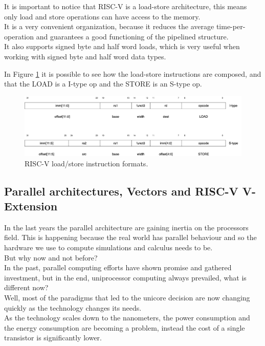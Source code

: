 It is important to notice that RISC-V is a load-store architecture, this means only load and store operations can have access to the memory.\\
It is a very convenient organization, because it reduces the average time-per-operation and guarantees a good functioning of the pipelined structure.\\

It also supports signed byte and half word loads, which is very useful when  working with signed byte and half word data types.

In Figure \ref{riscv-load-store} it is possible to see how the load-store instructions are composed, and that the LOAD is a I-type op and the STORE is an S-type op.

\begin{figure}[H]
    \centering
    \includegraphics[scale = 0.27]{Chapter_1/img/riscv-load-store.png}
    \caption{RISC-V load/store instruction formats. \cite{RISC-V-Instruction-Set-Manual}}
    \label{riscv-load-store}
\end{figure}


\subsection{Parallel architectures, Vectors and RISC-V V-Extension}
In the last years the parallel architecture are gaining inertia on the processors field. This is happening because the real world has parallel behaviour and so the hardware we use to compute simulations and calculus needs to be.\cite{Parallel-Computing}\\
But why now and not before?\\
In the past, parallel computing efforts have shown promise and gathered investment, but in the end, uniprocessor computing always prevailed, what is different now?\\
Well, most of the paradigms that led to the unicore decision are now changing quickly as the technology changes its needs.\\
As the technology scales down to the nanometers, the power consumption and the energy consumption are becoming a problem, instead the cost of a single transistor is significantly lower.\\

